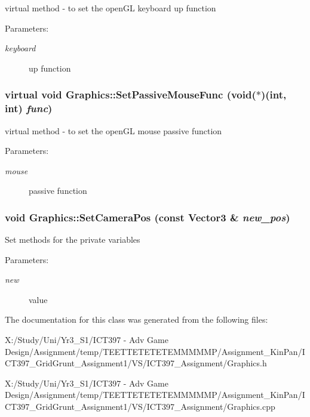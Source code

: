 virtual method - to set the openGL keyboard up function \begin{Desc}
\item[Parameters:]
\begin{description}
\item[{\em keyboard}]up function \end{description}
\end{Desc}
\hypertarget{class_graphics_c015a0e21a8880c52f12bc0d05cb8735}{
\subsubsection[SetPassiveMouseFunc]{\setlength{\rightskip}{0pt plus 5cm}virtual void Graphics::SetPassiveMouseFunc (void($\ast$)(int, int) {\em func})}}
\label{class_graphics_c015a0e21a8880c52f12bc0d05cb8735}


virtual method - to set the openGL mouse passive function \begin{Desc}
\item[Parameters:]
\begin{description}
\item[{\em mouse}]passive function \end{description}
\end{Desc}
\hypertarget{class_graphics_a9ef00ac25e4a1985fa5a4250efb1f5b}{
\subsubsection[SetCameraPos]{\setlength{\rightskip}{0pt plus 5cm}void Graphics::SetCameraPos (const {\bf Vector3} \& {\em new\_\-pos})}}
\label{class_graphics_a9ef00ac25e4a1985fa5a4250efb1f5b}


Set methods for the private variables \begin{Desc}
\item[Parameters:]
\begin{description}
\item[{\em new}]value \end{description}
\end{Desc}


The documentation for this class was generated from the following files:\begin{CompactItemize}
\item 
X:/Study/Uni/Yr3\_\-S1/ICT397 - Adv Game Design/Assignment/temp/TEETTETETETEMMMMMP/Assignment\_\-KinPan/ICT397\_\-GridGrunt\_\-Assignment1/VS/ICT397\_\-Assignment/Graphics.h\item 
X:/Study/Uni/Yr3\_\-S1/ICT397 - Adv Game Design/Assignment/temp/TEETTETETETEMMMMMP/Assignment\_\-KinPan/ICT397\_\-GridGrunt\_\-Assignment1/VS/ICT397\_\-Assignment/Graphics.cpp\end{CompactItemize}
